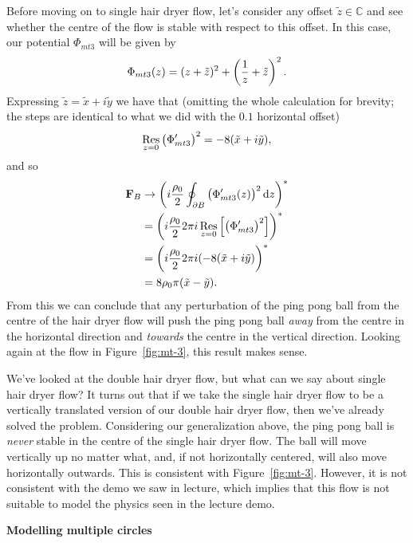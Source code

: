 \documentclass{article}
\DeclareMathOperator*{\res}{Res}
\newcommand{\C}{\mathbb{C}}
\def\*#1{\mathbf{#1}}
\newcommand{\tiz}{\tilde{z}}
\newcommand{\tix}{\tilde{x}}
\newcommand{\tiy}{\tilde{y}}
\begin{document}
Before moving on to single hair dryer flow, let's consider any offset
$\tiz \in \C$ and see whether the centre of the flow is stable with
respect to this offset. In this case, our potential $\Phi_{mt3}$ will be
given by
%
\begin{equation*}
    \Phi_{mt3}(z) = (z + \tiz)^2 + \del{\frac{1}{z} + \tiz}^2
    .
\end{equation*}
%
Expressing $\tiz = \tix + i \tiy$ we have that (omitting the whole
calculation for brevity; the steps are identical to what we did with the
$0.1$ horizontal offset)
%
\begin{equation*}
    \res_{z = 0} \del{\Phi^\prime_{mt3}}^2 = -8 (\tix + i \tiy)
    ,
\end{equation*}
%
and so
%
\begin{align*}
    \*F_B
        &\to \del{i \frac{\rho_0}{2} \oint_{\partial B} \del{\Phi_{mt3}^\prime(z)}^2 \dif z}^* \\
        &= \del{i \frac{\rho_0}{2} 2 \pi i \res_{z = 0} \sbr{\del{\Phi^\prime_{mt3}}^2}}^* \\
        &= \del{i \frac{\rho_0}{2} 2 \pi i (- 8 (\tix + i \tiy)}^* \\
        &= 8 \rho_0 \pi (\tix - \tiy)
    .
\end{align*}
%
From this we can conclude that any perturbation of the ping pong ball
from the centre of the hair dryer flow will push the ping pong ball
\textit{away} from the centre in the horizontal direction and
\textit{towards} the centre in the vertical direction. Looking again at
the flow in Figure~\ref{fig:mt-3}, this result makes sense.

We've looked at the double hair dryer flow, but what can we say about
single hair dryer flow? It turns out that if we take the single hair
dryer flow to be a vertically translated version of our double hair
dryer flow, then we've already solved the problem. Considering our
generalization above, the ping pong ball is \textit{never} stable in the
centre of the single hair dryer flow. The ball will move vertically up
no matter what, and, if not horizontally centered, will also move
horizontally outwards. This is consistent with Figure~\ref{fig:mt-3}.
However, it is not consistent with the demo we saw in lecture, which
implies that this flow is not suitable to model the physics seen in the
lecture demo.

\textbf{Modelling multiple circles}
\end{document}

